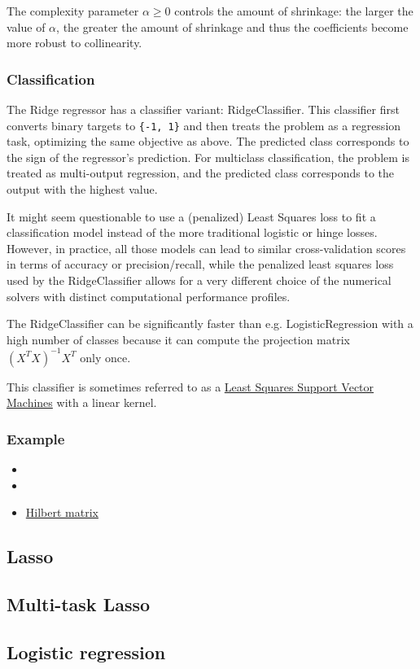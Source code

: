 The complexity parameter $\alpha\ge 0$ controls the amount of shrinkage: the larger the value of $\alpha$, the greater the amount of shrinkage and thus the coefficients become more robust to collinearity.

\subsubsection{Classification}

The Ridge regressor has a classifier variant: RidgeClassifier. This classifier first converts binary targets to \verb|{-1, 1}| and then treats the problem as a regression task, optimizing the same objective as above. The predicted class corresponds to the sign of the regressor’s prediction. For multiclass classification, the problem is treated as multi-output regression, and the predicted class corresponds to the output with the highest value.

It might seem questionable to use a (penalized) Least Squares loss to fit a classification model instead of the more traditional logistic or hinge losses. However, in practice, all those models can lead to similar cross-validation scores in terms of accuracy or precision/recall, while the penalized least squares loss used by the RidgeClassifier allows for a very different choice of the numerical solvers with distinct computational performance profiles.

The RidgeClassifier can be significantly faster than e.g. LogisticRegression with a high number of classes because it can compute the projection matrix $(X^T X)^{-1} X^T$ only once.

This classifier is sometimes referred to as a \href{https://en.wikipedia.org/wiki/Least-squares_support_vector_machine}{Least Squares Support Vector Machines} with a linear kernel.
\subsubsection{Example}
\begin{itemize}
\item {}
\item {}

\item \href{https://en.wikipedia.org/wiki/Hilbert_matrix}{Hilbert matrix}

\end{itemize}
\subsection{Lasso}
\subsection{Multi-task Lasso}

\subsection{Logistic regression\label{Logistic regression}}




